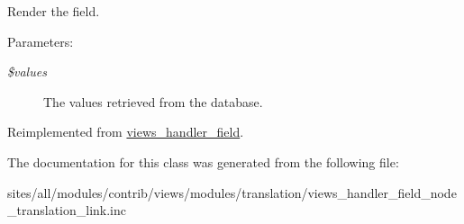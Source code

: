 Render the field.

\begin{Desc}
\item[Parameters:]
\begin{description}
\item[{\em \$values}]The values retrieved from the database. \end{description}
\end{Desc}


Reimplemented from \hyperlink{classviews__handler__field_82ff951c5e9ceb97b2eab86f880cbc1e}{views\_\-handler\_\-field}.

The documentation for this class was generated from the following file:\begin{CompactItemize}
\item 
sites/all/modules/contrib/views/modules/translation/views\_\-handler\_\-field\_\-node\_\-translation\_\-link.inc\end{CompactItemize}
